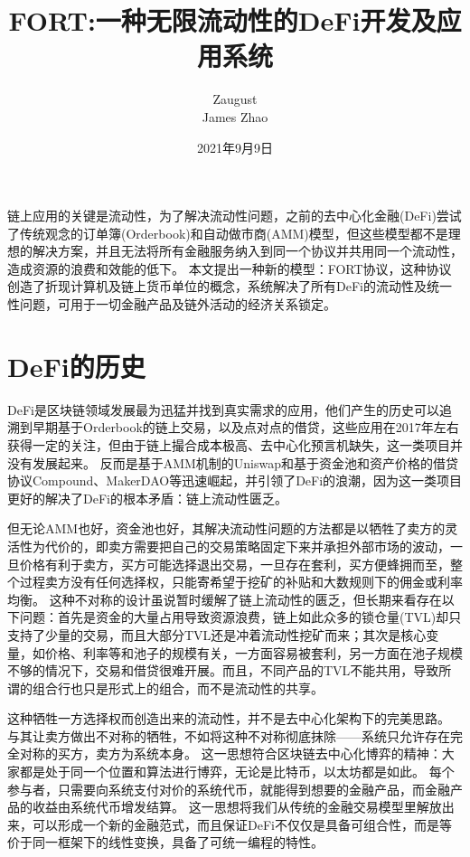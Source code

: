 \documentclass[letterpaper,11pt]{ctexart}
\begin{document}
\title{FORT:一种无限流动性的DeFi开发及应用系统}
\author{Zaugust \\ James Zhao}
\date{2021年9月9日}
\maketitle


链上应用的关键是流动性，为了解决流动性问题，之前的去中心化金融(DeFi)尝试了传统观念的订单簿(Orderbook)和自动做市商(AMM)模型，但这些模型都不是理想的解决方案，并且无法将所有金融服务纳入到同一个协议并共用同一个流动性，造成资源的浪费和效能的低下。
本文提出一种新的模型：FORT协议，这种协议创造了折现计算机及链上货币单位的概念，系统解决了所有DeFi的流动性及统一性问题，可用于一切金融产品及链外活动的经济关系锁定。

\section{DeFi的历史}

DeFi是区块链领域发展最为迅猛并找到真实需求的应用，他们产生的历史可以追溯到早期基于Orderbook的链上交易，以及点对点的借贷，这些应用在2017年左右获得一定的关注，但由于链上撮合成本极高、去中心化预言机缺失，这一类项目并没有发展起来。
反而是基于AMM机制的Uniswap和基于资金池和资产价格的借贷协议Compound、MakerDAO等迅速崛起，并引领了DeFi的浪潮，因为这一类项目更好的解决了DeFi的根本矛盾：链上流动性匮乏。

但无论AMM也好，资金池也好，其解决流动性问题的方法都是以牺牲了卖方的灵活性为代价的，即卖方需要把自己的交易策略固定下来并承担外部市场的波动，一旦价格有利于卖方，买方可能选择退出交易，一旦存在套利，买方便蜂拥而至，整个过程卖方没有任何选择权，只能寄希望于挖矿的补贴和大数规则下的佣金或利率均衡。
这种不对称的设计虽说暂时缓解了链上流动性的匮乏，但长期来看存在以下问题：首先是资金的大量占用导致资源浪费，链上如此众多的锁仓量(TVL)却只支持了少量的交易，而且大部分TVL还是冲着流动性挖矿而来；其次是核心变量，如价格、利率等和池子的规模有关，一方面容易被套利，另一方面在池子规模不够的情况下，交易和借贷很难开展。而且，不同产品的TVL不能共用，导致所谓的组合行也只是形式上的组合，而不是流动性的共享。

这种牺牲一方选择权而创造出来的流动性，并不是去中心化架构下的完美思路。
与其让卖方做出不对称的牺牲，不如将这种不对称彻底抹除——系统只允许存在完全对称的买方，卖方为系统本身。
这一思想符合区块链去中心化博弈的精神：大家都是处于同一个位置和算法进行博弈，无论是比特币，以太坊都是如此。
每个参与者，只需要向系统支付对价的系统代币，就能得到想要的金融产品，而金融产品的收益由系统代币增发结算。
这一思想将我们从传统的金融交易模型里解放出来，可以形成一个新的金融范式，而且保证DeFi不仅仅是具备可组合性，而是等价于同一框架下的线性变换，具备了可统一编程的特性。
\end{document}
